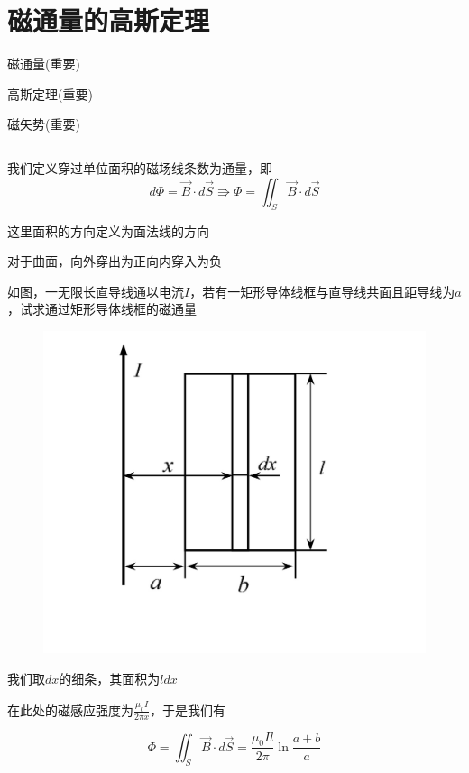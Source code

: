\documentclass[lang=cn,10pt]{elegantbook}
\begin{document}
	\section{磁通量的高斯定理}
	\begin{introduction}
		\item 磁通量(重要)
		\item 高斯定理(重要)
		\item 磁矢势(重要)
	\end{introduction}
	\subsection{\color{red}}
	\begin{definition}[磁通量]
		我们定义穿过单位面积的磁场线条数为通量，即
		\begin{equation*}
			d\varPhi =\overrightarrow{B}\cdot d\overrightarrow{S}\Rrightarrow \varPhi =\iint_S{\overrightarrow{B}\cdot d\overrightarrow{S}}
		\end{equation*}
	\end{definition}
	\begin{remark}
		这里面积的方向定义为面法线的方向
	\end{remark}
	\begin{remark}
		对于曲面，向外穿出为正向内穿入为负
	\end{remark}
	\begin{example}
		如图，一无限长直导线通以电流$I$，若有一矩形导体线框与直导线共面且距导线为$a$，试求通过矩形导体线框的磁通量
		
\begin{figure}[H]
	\centering
	\includegraphics[width=0.18\linewidth]{image/IMG_0429(20231122-122542)}
	\caption{}
	\label{fig:img042920231122-122542}
\end{figure}
	\end{example}
	\begin{solution}
		我们取$dx$的细条，其面积为$ldx$
		
		在此处的磁感应强度为$\frac{\mu _0I}{2\pi x}$，于是我们有
		
		\begin{equation*}
			\varPhi =\iint_S{\overrightarrow{B}\cdot d\overrightarrow{S}}=\frac{\mu _0Il}{2\pi}\ln \frac{a+b}{a}
		\end{equation*}
	\end{solution}
\end{document}
